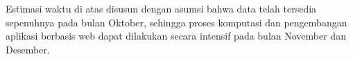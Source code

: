 \documentclass[a4paper]{article}
\theoremstyle{definition} %
\begin{document}
Estimasi waktu di atas disusun dengan asumsi bahwa data telah tersedia sepenuhnya pada bulan Oktober, sehingga proses komputasi dan pengembangan aplikasi berbasis web dapat dilakukan secara intensif pada bulan November dan Desember.

\newpage
\nolinenumbers


\end{document}
